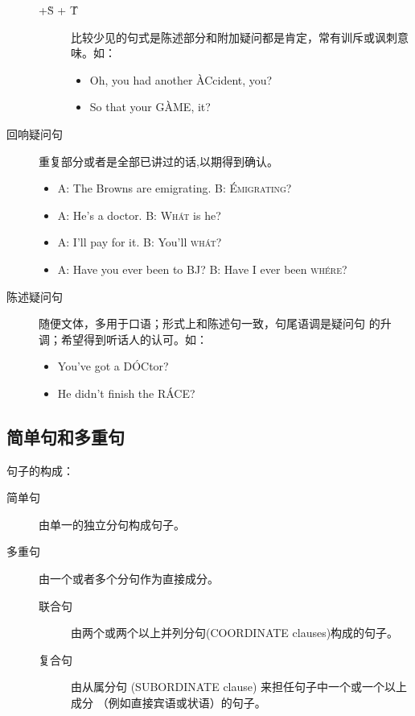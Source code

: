 \begin{description}
\begin{description}
  \item[+\`S + \'T] 比较少见的句式是陈述部分和附加疑问都是肯定，常有训斥或讽刺意味。如：
    \begin{itemize}
    \item Oh, you had another \`ACcident,  you?
    \item So that your G\`AME,  it?
    \end{itemize}
  \end{description}


\item[回响疑问句] 重复部分或者是全部已讲过的话,以期得到确认。
\begin{itemize}
\item A: The Browns are emigrating. \qquad B: \textsc{\'Emigrating?}
\item A: He's a doctor. \qquad B: \textsc{Wh\'at} is he?
\item A: I'll pay for it. \qquad B: You'll \textsc{wh\'at}?
\item A: Have you ever been to BJ? \qquad B: Have I ever been \textsc{wh\'ere}?
\end{itemize}

\item[陈述疑问句] 随便文体，多用于口语；形式上和陈述句一致，句尾语调是疑问句
  的升调；希望得到听话人的认可。如：
  \begin{itemize}
  \item You've got a D\'OCtor?
  \item He didn't finish the R\'ACE?
  \end{itemize}
\end{description}

\subsection{简单句和多重句}

句子的构成：
\begin{description}
\item[简单句] 由单一的独立分句构成句子。
\item[多重句] 由一个或者多个分句作为直接成分。
  \begin{description}
  \item [联合句] 由两个或两个以上并列分句(COORDINATE clauses)构成的句子。
  \item [复合句] 由从属分句 (SUBORDINATE clause) 来担任句子中一个或一个以上成分
    （例如直接宾语或状语）的句子。
  \end{description}
\end{description}

